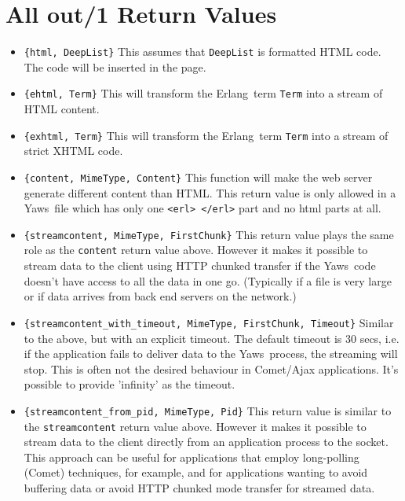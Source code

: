 \documentclass[11pt,oneside,english]{book}
\newcommand{\Erlang}            %
        {{\sc Erlang}}
\newcommand{\Yaws}            %
        {{\sc Yaws}}
\begin{document}
\section{All out/1 Return Values}

\begin{itemize}


\item \verb+{html, DeepList}+ This assumes that \verb+DeepList+ is
  formatted HTML code.  The code will be inserted in the page.

\item \verb+{ehtml, Term}+ This will transform the \Erlang\ term
  \verb+Term+ into a stream of HTML content.

\item \verb+{exhtml, Term}+ This will transform the \Erlang\ term
  \verb+Term+ into a stream of strict XHTML code.

\item \verb+{content, MimeType, Content}+ This function will make the
  web server generate different content than HTML. This return value
  is only allowed in a \Yaws\ file which has only one
  \verb+<erl> </erl>+ part and no html parts at all.

\item \verb+{streamcontent, MimeType, FirstChunk}+ This return value
  plays the same role as the \verb+content+ return value above.
  However it makes it possible to stream data to the client using HTTP
  chunked transfer if the \Yaws\ code doesn't have access to all the
  data in one go. (Typically if a file is very large or if data
  arrives from back end servers on the network.)

\item
  \verb+{streamcontent_with_timeout, MimeType, FirstChunk, Timeout}+
  Similar to the above, but with an explicit timeout. The default
  timeout is 30 secs, i.e. if the application fails to deliver data to
  the \Yaws\ process, the streaming will stop. This is often not the
  desired behaviour in Comet/Ajax applications. It's possible to
  provide 'infinity' as the timeout.

\item \verb+{streamcontent_from_pid, MimeType, Pid}+ This return value
  is similar to the \verb+streamcontent+ return value above.  However
  it makes it possible to stream data to the client directly from an
  application process to the socket. This approach can be useful for
  applications that employ long-polling (Comet) techniques, for
  example, and for applications wanting to avoid buffering data or
  avoid HTTP chunked mode transfer for streamed data.


\end{itemize}
\end{document}
